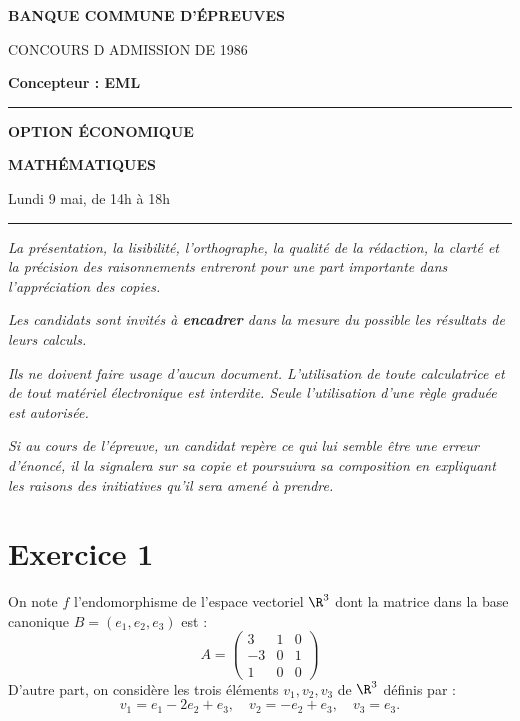 \documentclass[11pt]{article}%
\begin{document}

\begin{center}
{\LARG\E\textbf{BANQUE COMMUNE D'ÉPREUVES}}



{\large \textsc{CONCOURS D ADMISSION DE 1986}}



{\large \textbf{Concepteur : EML}}



\rule{2.39cm}{0.05cm}



{\Large \textbf{OPTION ÉCONOMIQUE}}



{\Large \textbf{MATHÉMATIQUES }}



{\Large Lundi 9 mai, de 14h à 18h}



\rule{2.39cm}{0.05cm}
\end{center}

\textit{La présentation, la lisibilité, l'orthographe, la qualité
de la rédaction, la clarté et la précision des raisonnements
entreront pour une part importante dans l'appréciation des copies.}

\textit{Les candidats sont invités à \textbf{encadrer} dans la mesure
du possible les résultats de leurs calculs.}

\textit{Ils ne doivent faire usage d'aucun document. L'utilisation de
toute
calculatrice et de tout matériel électronique est interdite. Seule
l'utilisation d'une règle graduée est autorisée.}

\textit{Si au cours de l'épreuve, un candidat repère ce qui lui semble
être une erreur d'énoncé, il la signalera sur sa copie et
poursuivra sa composition en expliquant les raisons des initiatives
qu'il sera
amené à prendre.}

\vspace*{3cm}

\section*{Exercice 1}

On note $f$ l'endomorphisme de l'espace vectoriel $\R^{3}$ dont la
matrice dans la base canonique $B = (e_{1},e_{2},e_{3})$ est : 
\[
A = \left( 
\begin{array}{ccc}
3 & 1 & 0 \\
-3 & 0 & 1 \\
1 & 0 & 0
\end{array}
\right)
\]
D'autre part, on considère les trois éléments $v_{1},v_{2},v_{3}$ de
$\R^{3}$ définis par : 
\[
v_{1} = e_{1}-2e_{2} + e_{3},\quad v_{2} = -e_{2} + e_{3},\quad v_{3} =
e_{3}.
\]
\end{document}
